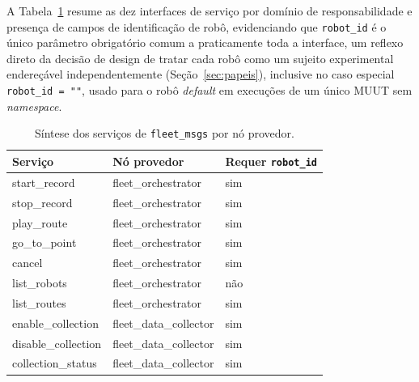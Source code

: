 A Tabela~\ref{tab:fleet_msgs_sintese} resume as dez interfaces de serviço por
domínio de responsabilidade e presença de campos de identificação de robô,
evidenciando que \texttt{robot\_\allowbreak id} é o único parâmetro obrigatório comum a
praticamente toda a interface, um reflexo direto da decisão de design de
tratar cada robô como um sujeito experimental endereçável independentemente
(Seção~\ref{sec:papeis}), inclusive no caso especial \texttt{robot\_\allowbreak id = ""},
usado para o robô \textit{default} em execuções de um único MUUT sem
\textit{namespace}.

\begin{table}[H]
\centering
\caption{Síntese dos serviços de \texttt{fleet\_\allowbreak msgs} por nó provedor.}
\label{tab:fleet_msgs_sintese}
\begin{tabular}{lll}
\toprule
Serviço & Nó provedor & Requer \texttt{robot\_\allowbreak id} \\
\midrule
start\_record & fleet\_orchestrator & sim \\
stop\_record & fleet\_orchestrator & sim \\
play\_route & fleet\_orchestrator & sim \\
go\_to\_point & fleet\_orchestrator & sim \\
cancel & fleet\_orchestrator & sim \\
list\_robots & fleet\_orchestrator & não \\
list\_routes & fleet\_orchestrator & sim \\
enable\_collection & fleet\_data\_collector & sim \\
disable\_collection & fleet\_data\_collector & sim \\
collection\_status & fleet\_data\_collector & sim \\
\bottomrule
\end{tabular}
\end{table}
